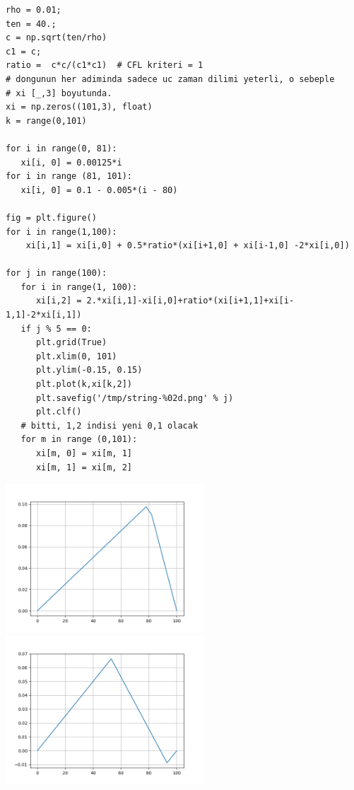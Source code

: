 \documentclass[12pt,fleqn]{article}\usepackage{../../common}
\begin{document}
\begin{verbatim}
rho = 0.01;
ten = 40.;
c = np.sqrt(ten/rho)               
c1 = c;
ratio =  c*c/(c1*c1)  # CFL kriteri = 1
# dongunun her adiminda sadece uc zaman dilimi yeterli, o sebeple
# xi [_,3] boyutunda. 
xi = np.zeros((101,3), float)                            
k = range(0,101)

for i in range(0, 81):
   xi[i, 0] = 0.00125*i         
for i in range (81, 101):
   xi[i, 0] = 0.1 - 0.005*(i - 80) 

fig = plt.figure()  
for i in range(1,100): 
    xi[i,1] = xi[i,0] + 0.5*ratio*(xi[i+1,0] + xi[i-1,0] -2*xi[i,0])  
    
for j in range(100):
   for i in range(1, 100):              
      xi[i,2] = 2.*xi[i,1]-xi[i,0]+ratio*(xi[i+1,1]+xi[i-1,1]-2*xi[i,1])
   if j % 5 == 0:      
      plt.grid(True)
      plt.xlim(0, 101)
      plt.ylim(-0.15, 0.15)
      plt.plot(k,xi[k,2])
      plt.savefig('/tmp/string-%02d.png' % j)
      plt.clf()
   # bitti, 1,2 indisi yeni 0,1 olacak
   for m in range (0,101):
      xi[m, 0] = xi[m, 1]
      xi[m, 1] = xi[m, 2]
\end{verbatim}

\includegraphics[width=20em]{string-00.png}
\includegraphics[width=20em]{string-25.png}
\end{document}
